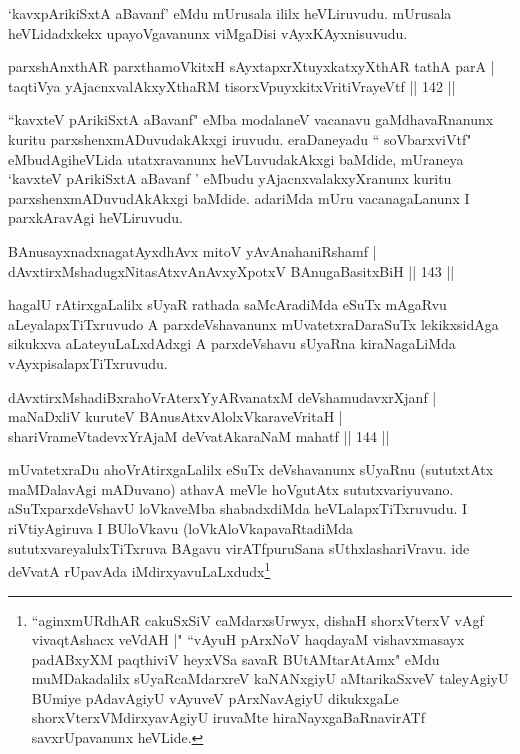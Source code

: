 \begin{artha}
`kavxpArikiSxtA aBavanf' eMdu mUrusala ililx heVLiruvudu. mUrusala heVLidadxkekx upayoVgavanunx viMgaDisi vAyxKAyxnisuvudu.
\end{artha}

\begin{shl}
parxshAnxthAR parxthamoVkitxH sAyxtapxrXtuyxkatxyXthAR tathA parA |\\
taqtiVya yAjacnxvalAkxyXthaRM tisorxV\s puyxkitxVritiVrayeVtf \hfill || 142 ||
\end{shl}

\begin{artha}
``kavxteV pArikiSxtA aBavanf" eMba modalaneV vacanavu gaMdhavaRnanunx kuritu parxshenxmADuvudakAkxgi iruvudu. eraDaneyadu `` soV\s barxviVtf" eMbudAgiheVLida utatxravanunx heVLuvudakAkxgi baMdide, mUraneya `kavxteV pArikiSxtA aBavanf ' eMbudu yAjacnxvalakxyXranunx kuritu parxshenxmADuvudAkAkxgi baMdide. adariMda mUru vacanagaLanunx I parxkAravAgi heVLiruvudu.
\end{artha}


\begin{shl}
BAnusayxnadxnagatAyx\s dhAvx mitoV yAvAnahaniRshamf |\\
dAvxtirxMshadugxNitasAtxvAnAvxyXpotxV BAnugaBasitxBiH \hfill || 143 ||
\end{shl}

\begin{artha}
hagalU rAtirxgaLalilx sUyaR rathada saMcAradiMda eSuTx mAgaRvu aLeyalapxTiTxruvudo A parxdeVshavanunx mUvatetxraDaraSuTx lekikxsidAga sikukxva aLateyuLaLxdAdxgi A parxdeVshavu sUyaRna kiraNagaLiMda vAyxpisalapxTiTxruvudu.
\end{artha}


\begin{shl}
dAvxtirxMshadiBxrahoVrAterxYyARvanatxM deVshamudavxrXjanf |\\
maNaDxliV kuruteV BAnusAtxvAlolxVkaraveVritaH |\\
shariVrameVtadevxYrAjaM deVvatAkaraNaM mahatf \hfill || 144 ||
\end{shl}

\begin{artha}
mUvatetxraDu ahoVrAtirxgaLalilx eSuTx deVshavanunx sUyaRnu (sututxtAtx maMDalavAgi mADuvano) athavA meVle hoVgutAtx sututxvariyuvano. aSuTxparxdeVshavU loVkaveMba shabadxdiMda heVLalapxTiTxruvudu. I riVtiyAgiruva I BUloVkavu (loVkAloVkapavaRtadiMda sututxvareyalulxTiTxruva BAgavu virATfpuruSana sUthxlashariVravu. ide deVvatA rUpavAda iMdirxyavuLaLxdudx\footnote{``aginxmURdhAR cakuSxSiV caMdarxsUrwyx, dishaH shorxVterxV vAgf vivaqtAshacx veVdAH |" ``vAyuH pArxNoV haqdayaM vishavxmasayx padABxyXM paqthiviV heyxVSa savaR BUtAMtarAtAmx" eMdu muMDakadalilx sUyaRcaMdarxreV kaNANxgiyU aMtarikaSxveV taleyAgiyU BUmiye pAdavAgiyU vAyuveV pArxNavAgiyU dikukxgaLe shorxVterxVMdirxyavAgiyU iruvaMte hiraNayxgaBaRnavirATf savxrUpavanunx heVLide.}
\end{artha}

